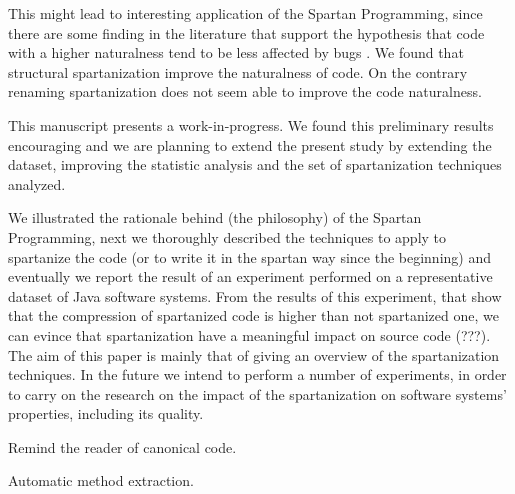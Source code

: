  This might lead to interesting application of the Spartan Programming, since 
 there are some finding in the literature that support the hypothesis that code 
 with a higher naturalness tend to be less affected by bugs 
 \cite{Hindle:Bar:Su:Gabel:Devanbu:12}.
 We found that structural spartanization improve the naturalness of code. 
 On the contrary renaming spartanization does not seem able to improve the code naturalness.
 
 This manuscript presents a work-in-progress. 
 We found this preliminary results encouraging and 
 we are planning to extend the present study by extending the dataset, improving the 
 statistic analysis and the set of spartanization techniques analyzed. 

 We illustrated the rationale behind (the philosophy) of the Spartan
 Programming, next we thoroughly described the techniques to apply to spartanize
 the code (or to write it in the spartan way since the beginning) and eventually
 we report the result of an experiment performed on a representative dataset of
 Java software systems.  From the results of this experiment, that show that the
 compression of spartanized code is higher than not spartanized one, we can
 evince that spartanization have a meaningful impact on source code (???).  The
 aim of this paper is mainly that of giving an overview of the spartanization
 techniques.  
 In the future we intend to perform a number of experiments, in
 order to carry on the research on the impact of the spartanization on software
 systems' properties, including its quality.
 
 Remind the reader of canonical code.
 
 Automatic method extraction.

